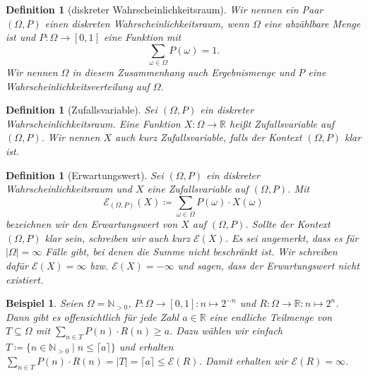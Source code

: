 \documentclass[a4paper]{article}
\newtheorem{beispiel}[satz]{Beispiel}
\newtheorem{definition}[satz]{Definition} %
\theoremstyle{nonumberplain}
\begin{document}
\newcommand{\probspace}{diskreter Wahr\-schein\-lich\-keits\-raum}
\newcommand{\probspacen}{diskreten Wahr\-schein\-lich\-keits\-raum}
\newcommand{\probspaceexraw}{(\Omega, P)}
\newcommand{\probspaceex}{$(\Omega, P)$}
\begin{definition}[\probspace{}] \label{def-probspace}
	\hspace{-0.5em} Wir nennen ein Paar \probspaceex{} einen \probspacen{}, wenn $\Omega$ eine abzählbare Menge ist und $P : \Omega \to [0,1] $ eine Funktion mit
	\begin{equation}
		\sum_{\omega \in \Omega} P(\omega) = 1 \text{.}
	\end{equation} Wir nennen $\Omega$ in diesem Zusammenhang auch Ergebnismenge und $P$ eine Wahr\-schein\-lich\-keitsverteilung auf $\Omega$.
\end{definition}
\newcommand{\rvar}{Zufallsvariable}
\begin{definition}[\rvar{}] \label{def-rvar}
	Sei \probspaceex{} ein \probspace{}. Eine Funktion $X : \Omega \to \mathbb{R}$ heißt \rvar{} auf \probspaceex{}. Wir nennen $X$ auch kurz \rvar{}, falls der Kontext \probspaceex{} klar ist.
\end{definition}
\newcommand{\expect}{Erwartungswert}
\newcommand{\mexp}{\mathcal{E}}
\begin{definition}[\expect{}] \label{def-expect}
	\hspace{1ex} Sei \probspaceex{} ein \probspace{} und $X$ eine \rvar{} auf \probspaceex{}. Mit
	\begin{equation}
		\mathcal{E}_{\probspaceexraw{}}(X) \coloneqq \sum_{\omega \in \Omega}{P(\omega) \cdot X(\omega)}
	\end{equation}
	bezeichnen wir den \expect{} von $X$ auf \probspaceex{}. Sollte der Kontext \probspaceex{} klar sein, schreiben wir auch kurz $\mathcal{E}(X)$. Es sei angemerkt, dass es für $|\Omega|=\infty$ Fälle gibt, bei denen die Summe nicht beschränkt ist. Wir schreiben dafür $\mathcal{E}(X) = \infty$ bzw. $\mathcal{E}(X) = -\infty$ und sagen, dass der Erwartungswert nicht existiert.
\end{definition}
\begin{beispiel}
	Seien $\Omega = \mathbb{N}_{>0}$, $P : \Omega \to [0,1] : n \mapsto 2^{-n}$ und $R : \Omega \to \mathbb{R} : n \mapsto 2^{n}$. Dann gibt es offensichtlich für jede Zahl $a \in \mathbb{R}$ eine endliche Teilmenge von $T \subseteq \Omega$ mit $\sum_{n \in T}{P(n) \cdot R(n)} \geq a$. Dazu wählen wir einfach $T \coloneqq \{n \in \mathbb{N}_{>0}\mid n \leq \lceil a \rceil \}$ und erhalten $\sum_{n \in T}{P(n) \cdot R(n)} = |T| = \lceil a \rceil \leq \mathcal{E}(R)$. Damit erhalten wir $\mathcal{E}(R) = \infty$.
\end{beispiel}
\end{document}
